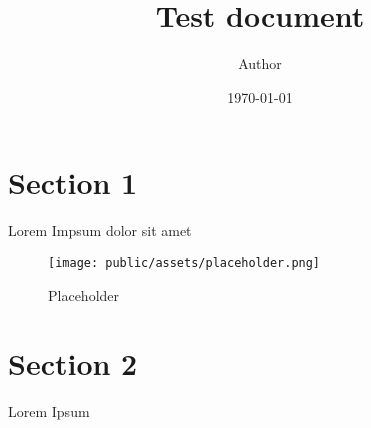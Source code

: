 \documentclass[11pt]{article}
\title{ Test document}
\author{ Author }
\date{\today}
\begin{document}
\maketitle
\pagebreak

\tableofcontents
\pagebreak


\section{Section 1}

Lorem Impsum dolor sit amet

\begin{figure}[h]
    \centering
    \texttt{[image: public/assets/placeholder.png]}
    \caption{Placeholder}
\end{figure}

\pagebreak
\section{Section 2}
Lorem Ipsum \\

\end{document}
